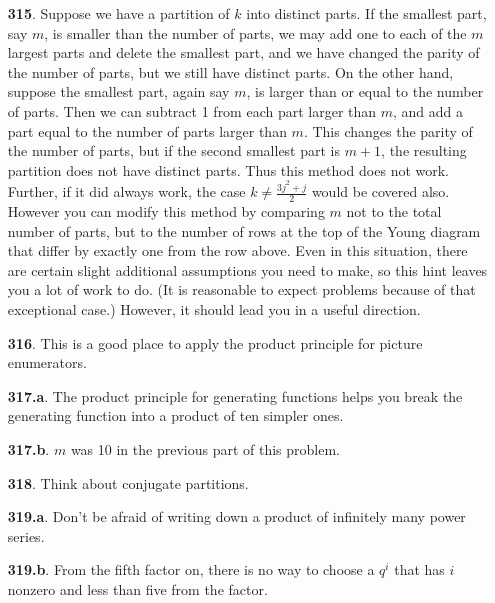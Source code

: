 \documentclass[10pt,]{book}
\theoremstyle{plain}
\theoremstyle{definition}
\theoremstyle{definition}
\theoremstyle{definition}
\numberwithin{equation}{chapter}
\begin{document}
\begin{itemize}[itemsep=1em]
\item[\textbf{315}.]\hypertarget{p-1556}{}%
Suppose we have a partition of \(k\) into distinct parts. If the smallest part, say \(m\), is smaller than the number of parts, we may add one to each of the \(m\) largest parts and delete the smallest part, and we have changed the parity of the number of parts, but we still have distinct parts. On the other hand, suppose the smallest part, again say \(m\), is larger than or equal to the number of parts. Then we can subtract 1 from each part larger than \(m\), and add a part equal to the number of parts larger than \(m\). This changes the parity of the number of parts, but if the second smallest part is \(m+1\), the resulting partition does not have distinct parts. Thus this method does not work. Further, if it did always work, the case \(k \ne \frac{3j^2+j}{2}\) would be covered also. However you can modify this method by comparing \(m\) not to the total number of parts, but to the number of rows at the top of the Young diagram that differ by exactly one from the row above. Even in this situation, there are certain slight additional assumptions you need to make, so this hint leaves you a lot of work to do. (It is reasonable to expect problems because of that exceptional case.) However, it should lead you in a useful direction.%

\item[\textbf{316}.]\hypertarget{p-1563}{}%
This is a good place to apply the product principle for picture enumerators.%

\item[\textbf{317.a}.]\hypertarget{p-1569}{}%
The product principle for generating functions helps you break the generating function into a product of ten simpler ones.%

\item[\textbf{317.b}.]\hypertarget{p-1572}{}%
\(m\) was 10 in the previous part of this problem.%

\item[\textbf{318}.]\hypertarget{p-1575}{}%
Think about conjugate partitions.%

\item[\textbf{319.a}.]\hypertarget{p-1579}{}%
Don't be afraid of writing down a product of infinitely many power series.%

\item[\textbf{319.b}.]\hypertarget{p-1582}{}%
From the fifth factor on, there is no way to choose a \(q^i\) that has \(i\) nonzero and less than five from the factor.%


\end{itemize}
\end{document}
